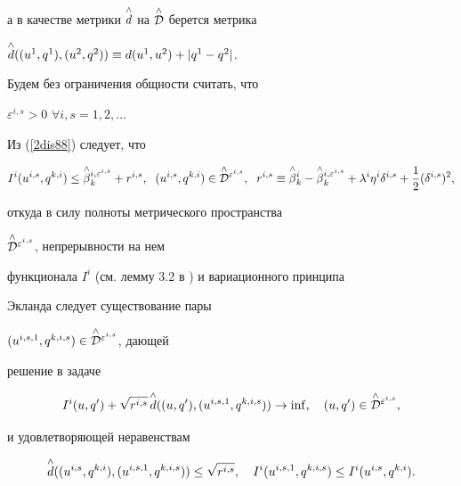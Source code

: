 а в качестве метрики $\overset{\wedge}{d}{}$ на $\overset{\wedge}{\cal D}{}$ берется метрика


$\overset{\wedge}{d}{}((u^1,q^1),(u^2,q^2))\equiv d(u^1,u^2)+|q^1-q^2|$.


Будем без ограничения общности считать, что


$\varepsilon^{i,s}>0$ $\forall i,s=1,2,\dotsc$


Из (\ref{2dis88}) следует, что


$$


I^i(u^{i,s},q^{k,i})\leq\up{\wedge}{\beta}_k^{i,\varepsilon^{i,s}}+


r^{i,s},\ \; (u^{i,s},q^{k,i})


\in\up{\wedge}{\cal D}^{\varepsilon^{i,s}},\ \;


r^{i,s}\equiv\up{\wedge}{\beta}_k^i-\up{\wedge}{\beta}_k^


{i,\varepsilon^{i,s}}+\lambda^i\eta^i\delta^{i,s}+\frac 12({\delta^{i,s}})^2,


$$


откуда в силу полноты метрического пространства


$\overset{\wedge}{\cal D}{}^{\varepsilon^{i,s}}$, непрерывности на нем


функционала $I^i$ (см. лемму 3.2 в \cite{sumin98}) и вариационного принципа


Экланда \cite{ekeland} следует существование пары


$(u^{i,s,1},q^{k,i,s})\in\overset{\wedge}{\cal D}{}^{\varepsilon^{i,s}}$, дающей


решение в задаче


\begin{equation}\label{2dis89}


I^i(u,q')+\sqrt{r^{i,s}}\,\up{\wedge}{d}


((u,q'),(u^{i,s,1},q^{k,i,s}))\to\inf,


\quad (u,q')\in\up{\wedge}{\cal D}^{\varepsilon^{i,s}},


\end{equation}


и удовлетворяющей неравенствам


\begin{equation}\label{2dis90}


\up{\wedge}{d}((u^{i,s},q^{k,i}),(u^{i,s,1},q^{k,i,s}))


\leq\sqrt{r^{i,s}},\quad


I^i(u^{i,s,1},q^{k,i,s})\leq I^i(u^{i,s},q^{k,i}).


\end{equation}


